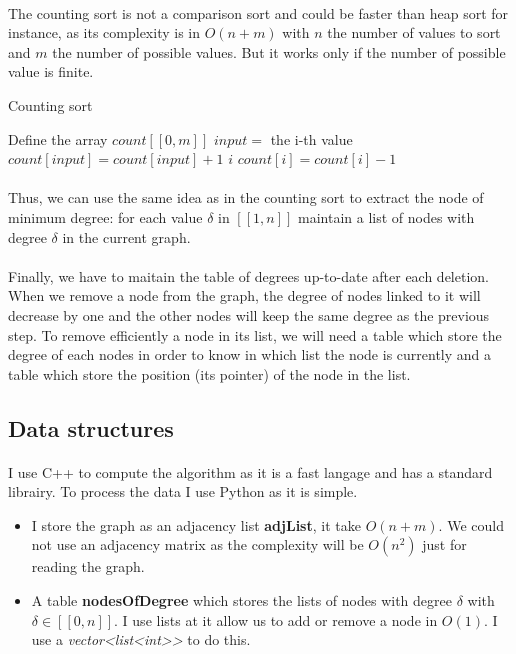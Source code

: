 \documentclass[english]{article}
\begin{document}
\begin{multicols}{2}
\paragraph{}
The counting sort is not a comparison sort and could be faster than heap sort for instance, as its complexity is in $O(n+m)$ with $n$ the number of values to sort and $m$ the number of possible values. But it works only if the number of possible value is finite.
\begin{algorithm}[H]
	\caption{Counting sort}
	\begin{algorithmic} 
	\STATE Define the array $count[[0,m]]$
		\STATE $input =$ the i-th value
		\STATE $count[input] = count[input] + 1$
	\ENDFOR
			\PRINT $i$
			\STATE $count[i]=count[i]-1$
		\ENDWHILE
	\ENDFOR
	\end{algorithmic}
\end{algorithm}
\paragraph{}
Thus, we can use the same idea as in the counting sort to extract the node of minimum degree: for each value $\delta$ in $[[1, n]]$ maintain a list of nodes with degree $\delta$ in the current graph.
\paragraph{}
Finally, we have to maitain the table of degrees up-to-date after each deletion.
When we remove a node from the graph, the degree of nodes linked to it will decrease by one and the other nodes will keep the same degree as the previous step.
To remove efficiently a node in its list, we will need a table which store the degree of each nodes in order to know in which list the node is currently and a table which store the position (its pointer) of the node in the list.
\subsection{Data structures}
\paragraph{}
I use C++ to compute the algorithm as it is a fast langage and has a standard librairy.
To process the data I use Python as it is simple.
\begin{itemize}
	\item I store the graph as an adjacency list {\bf adjList}, it take $O(n+m)$. We could not use an adjacency matrix as the complexity will be $O(n^2)$ just for reading the graph.
	\item A table {\bf nodesOfDegree} which stores the lists of nodes with degree $\delta$ with $\delta \in [[0,n]]$. I use lists at it allow us to add or remove a node in $O(1)$.
	\newline I use a {\it vector<list<int>{}>} to do this.
\end{itemize}

\end{multicols}
\end{document}
